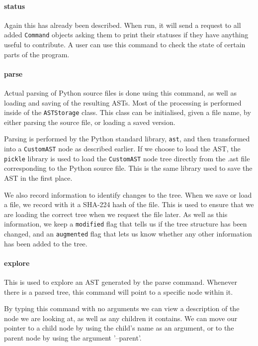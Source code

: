 \documentclass{report}
\begin{document}
\paragraph{status}

Again this has already been described. When run, it will send a request to all added \texttt{Command} objects asking them to print
their statuses if they have anything useful to contribute. A user can use this command to check the state of certain parts of the
program.

\paragraph{parse}

Actual parsing of Python source files is done using this command, as well as loading and saving of the resulting ASTs. Most of the processing
is performed inside of the \texttt{ASTStorage} class. This class can be initialised, given a file name, by either parsing the source file, or
loading a saved version.

Parsing is performed by the Python standard library, \texttt{ast}, and then transformed into a \texttt{CustomAST} node as described earlier.
If we choose to load the AST, the \texttt{pickle} library is used to load the \texttt{CustomAST} node tree directly from the .ast file
corresponding to the Python source file. This is the same library used to save the AST in the first place.

We also record information to identify changes to the tree. When we save or load a file, we record with it a SHA-224 hash of the file. This
is used to ensure that we are loading the correct tree when we request the file later. As well as this information, we keep a \texttt{modified}
flag that tells us if the tree structure has been changed, and an \texttt{augmented} flag that lets us know whether any other information has
been added to the tree.

\paragraph{explore}

This is used to explore an AST generated by the parse command. Whenever there is a parsed tree, this command will point to a specific node within it.

By typing this command with no arguments we can view a description of the node we are looking at, as well as any children it contains. We can move
our pointer to a child node by using the child's name as an argument, or to the parent node by using the argument '--parent'.
\end{document}
